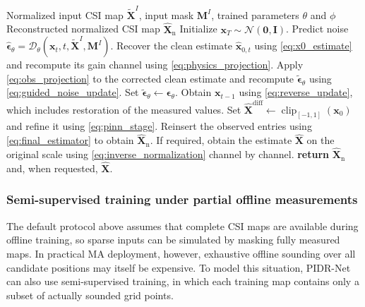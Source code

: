 \documentclass[lettersize,journal]{IEEEtran}
\newcommand{\vect}[1]{\boldsymbol{#1}}
\newcommand{\mat}[1]{\mathbf{#1}}
\begin{document}
\begin{algorithm}[t]
\caption{Online Sparse CSI Map Reconstruction}
\label{alg:online_inference}
\begin{algorithmic}[1]
\REQUIRE Normalized input CSI map $\widetilde{\mat{X}}^{I}$, input mask $\mat{M}^{I}$, trained parameters $\theta$ and $\phi$
\ENSURE Reconstructed normalized CSI map $\widehat{\mat{X}}_{\mathrm n}$
\STATE Initialize $\mat{x}_{T}\sim\mathcal{N}(\mat{0},\mat{I})$.
    \STATE Predict noise $\widehat{\vect{\epsilon}}_{\theta}=\mathcal{D}_{\theta}(\mat{x}_t,t,\widetilde{\mat{X}}^{I},\mat{M}^{I})$.
        \STATE Recover the clean estimate $\widehat{\mat{x}}_{0,t}$ using \eqref{eq:x0_estimate} and recompute its gain channel using \eqref{eq:physics_projection}.
        \STATE Apply \eqref{eq:obs_projection} to the corrected clean estimate and recompute $\widetilde{\vect{\epsilon}}_{\theta}$ using \eqref{eq:guided_noise_update}.
    \ELSE
        \STATE Set $\widetilde{\vect{\epsilon}}_{\theta}\leftarrow\widehat{\vect{\epsilon}}_{\theta}$.
    \ENDIF
    \STATE Obtain $\mat{x}_{t-1}$ using \eqref{eq:reverse_update}, which includes restoration of the measured values.
\ENDFOR
\STATE Set $\widehat{\mat{X}}^{\mathrm{diff}}\leftarrow\operatorname{clip}_{[-1,1]}(\mat{x}_0)$ and refine it using \eqref{eq:pinn_stage}.
\STATE Reinsert the observed entries using \eqref{eq:final_estimator} to obtain $\widehat{\mat{X}}_{\mathrm n}$.
\STATE If required, obtain the estimate $\widehat{\mat{X}}$ on the original scale using \eqref{eq:inverse_normalization} channel by channel.
\STATE \textbf{return} $\widehat{\mat{X}}_{\mathrm n}$ and, when requested, $\widehat{\mat{X}}$.
\end{algorithmic}
\end{algorithm}

\subsubsection{Semi-supervised training under partial offline measurements}

The default protocol above assumes that complete CSI maps are available during offline training, so sparse inputs can be simulated by masking fully measured maps. In practical MA deployment, however, exhaustive offline sounding over all candidate positions may itself be expensive. To model this situation, PIDR-Net can also use semi-supervised training, in which each training map contains only a subset of actually sounded grid points.
\end{document}
